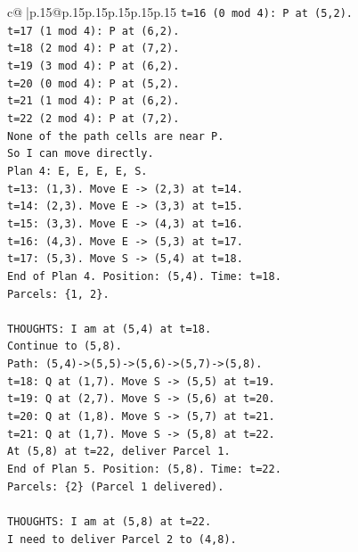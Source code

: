 \documentclass{article}
\begin{document}
{\begin{supertabular}{c@{$\;$}|p{.15\linewidth}@{}p{.15\linewidth}p{.15\linewidth}p{.15\linewidth}p{.15\linewidth}p{.15\linewidth}}
{{{\texttt{t=16 (0 mod 4): P at (5,2).} \\
\texttt{t=17 (1 mod 4): P at (6,2).} \\
\texttt{t=18 (2 mod 4): P at (7,2).} \\
\texttt{t=19 (3 mod 4): P at (6,2).} \\
\texttt{t=20 (0 mod 4): P at (5,2).} \\
\texttt{t=21 (1 mod 4): P at (6,2).} \\
\texttt{t=22 (2 mod 4): P at (7,2).} \\
\texttt{None of the path cells are near P.} \\
\texttt{So I can move directly.} \\
\texttt{Plan 4: E, E, E, E, S.} \\
\texttt{t=13: (1,3). Move E {-}> (2,3) at t=14.} \\
\texttt{t=14: (2,3). Move E {-}> (3,3) at t=15.} \\
\texttt{t=15: (3,3). Move E {-}> (4,3) at t=16.} \\
\texttt{t=16: (4,3). Move E {-}> (5,3) at t=17.} \\
\texttt{t=17: (5,3). Move S {-}> (5,4) at t=18.} \\
\texttt{End of Plan 4. Position: (5,4). Time: t=18.} \\
\texttt{Parcels: \{1, 2\}.} \\
\\ 
\texttt{THOUGHTS: I am at (5,4) at t=18.} \\
\texttt{Continue to (5,8).} \\
\texttt{Path: (5,4){-}>(5,5){-}>(5,6){-}>(5,7){-}>(5,8).} \\
\texttt{t=18: Q at (1,7). Move S {-}> (5,5) at t=19.} \\
\texttt{t=19: Q at (2,7). Move S {-}> (5,6) at t=20.} \\
\texttt{t=20: Q at (1,8). Move S {-}> (5,7) at t=21.} \\
\texttt{t=21: Q at (1,7). Move S {-}> (5,8) at t=22.} \\
\texttt{At (5,8) at t=22, deliver Parcel 1.} \\
\texttt{End of Plan 5. Position: (5,8). Time: t=22.} \\
\texttt{Parcels: \{2\} (Parcel 1 delivered).} \\
\\ 
\texttt{THOUGHTS: I am at (5,8) at t=22.} \\
\texttt{I need to deliver Parcel 2 to (4,8).} \\
}}}
\end{supertabular}}
\end{document}
